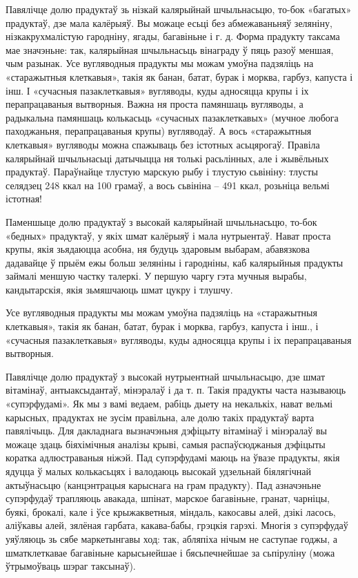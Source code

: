 Павялічце долю прадуктаў зь нізкай калярыйнай шчыльнасьцю, то-бок «багатых» прадуктаў, дзе мала калёрыяў. Вы можаце есьці без абмежаваньняў зеляніну, нізкакрухмалістую гародніну, ягады, багавіньне і г. д. Форма прадукту таксама мае значэньне: так, калярыйная шчыльнасьць вінаграду ў пяць разоў меншая, чым разынак. Усе вугляводныя прадукты мы можам умоўна падзяліць на «старажытныя клеткавыя», такія як банан, батат, бурак і морква, гарбуз, капуста і інш. І «сучасныя пазаклеткавыя» вугляводы, куды адносяцца крупы і іх перапрацаваныя вытворныя. Важна ня проста памяншаць вугляводы, а радыкальна памяншаць колькасьць «сучасных пазаклеткавых» (мучное любога паходжаньня, перапрацаваныя крупы) вугляводаў. А вось «старажытныя клеткавыя» вугляводы можна спажываць без істотных асьцярогаў. Правіла калярыйнай шчыльнасьці датычыцца ня толькі расьлінных, але і жывёльных прадуктаў. Параўнайце тлустую марскую рыбу і тлустую сьвініну: тлусты селядзец 248 ккал на 100 грамаў, а вось сьвініна – 491 ккал, розьніца вельмі істотная!

Паменшыце долю прадуктаў з высокай калярыйнай шчыльнасьцю, то-бок «бедных» прадуктаў, у якіх шмат калёрыяў і мала нутрыентаў. Нават проста крупы, якія зьядаюцца асобна, ня будуць здаровым выбарам, абавязкова дадавайце ў прыём ежы больш зеляніны і гародніны, каб калярыйныя прадукты займалі меншую частку талеркі. У першую чаргу гэта мучныя вырабы, кандытарскія, якія зьмяшчаюць шмат цукру і тлушчу.

Усе вугляводныя прадукты мы можам умоўна падзяліць на «старажытныя клеткавыя», такія як банан, батат, бурак і морква, гарбуз, капуста і інш., і «сучасныя пазаклеткавыя» вугляводы, куды адносяцца крупы і іх перапрацаваныя вытворныя.

Павялічце долю прадуктаў з высокай нутрыентнай шчыльнасьцю, дзе шмат вітамінаў, антыаксыдантаў, мінэралаў і да т. п. Такія прадукты часта называюць «супэрфудамі». Як мы з вамі ведаем, рабіць дыету на некалькіх, нават вельмі карысных, прадуктах не зусім правільна, але долю такіх прадуктаў варта павялічыць. Для дакладнага вызначэньня дэфіцыту вітамінаў і мінэралаў вы можаце здаць біяхімічныя аналізы крыві, самыя распаўсюджаныя дэфіцыты коратка адлюстраваныя ніжэй. Пад супэрфудамі маюць на ўвазе прадукты, якія ядуцца ў малых колькасьцях і валодаюць высокай удзельнай біялягічнай актыўнасьцю (канцэнтрацыя карыснага на грам прадукту). Пад азначэньне супэрфудаў трапляюць авакада, шпінат, марское багавіньне, гранат, чарніцы, буякі, брокалі, кале і ўсе крыжакветныя, міндаль, какосавы алей, дзікі ласось, аліўкавы алей, зялёная гарбата, какава-бабы, грэцкія гарэхі. Многія з супэрфудаў уяўляюць зь сябе маркетынгавы ход: так, абляпіха нічым не саступае годжы, а шматклеткавае багавіньне карысьнейшае і бясьпечнейшае за сьпіруліну (можа ўтрымоўваць шэраг таксынаў).

